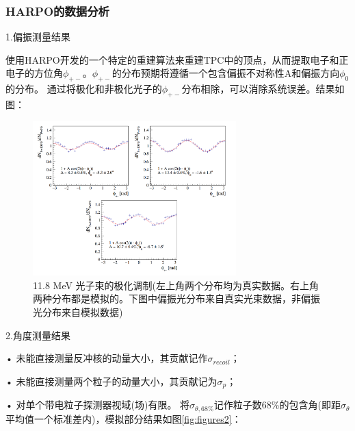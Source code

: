 \subsubsection{HARPO的数据分析}
1.偏振测量结果\par
使用HARPO开发的一个特定的重建算法来重建TPC中的顶点，从而提取电子和正电子的方位角$\phi_{+-}$。$\phi_{+-}$的分布预期将遵循一个包含偏振不对称性A和偏振方向$\phi_{0}$的分布。
通过将极化和非极化光子的$\phi_{+-}$分布相除，可以消除系统误差。结果如图：
\begin{figure}[H] %
	\centering %
	\includegraphics[width=0.7\textwidth]{figures/18HA测量结果.png} %
	\caption{11.8 MeV 光子束的极化调制(左上角两个分布均为真实数据。右上角两种分布都是模拟的。下图中偏振光分布来自真实光束数据，非偏振光分布来自模拟数据)} %
\end{figure}
2.角度测量结果\par
• 未能直接测量反冲核的动量大小，其贡献记作$\sigma_{recoil}$；\par
• 未能直接测量两个粒子的动量大小，其贡献记为$\sigma_{p}$；\par
• 对单个带电粒子探测器视域(场)有限。
将$\sigma_{\theta,68\%}$记作粒子数68\%的包含角(即距$\sigma_{\theta}$平均值一个标准差内)，模拟部分结果如图\ref{fig:figures2}：
